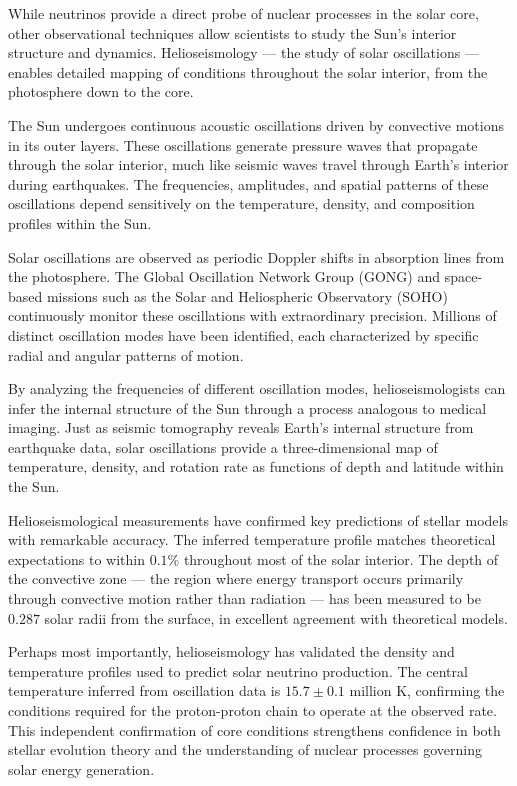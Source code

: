 While neutrinos provide a direct probe of nuclear processes in the solar core, other observational techniques allow scientists to study the Sun's interior structure and dynamics. Helioseismology — the study of solar oscillations — enables detailed mapping of conditions throughout the solar interior, from the photosphere down to the core.

The Sun undergoes continuous acoustic oscillations driven by convective motions in its outer layers. These oscillations generate pressure waves that propagate through the solar interior, much like seismic waves travel through Earth's interior during earthquakes. The frequencies, amplitudes, and spatial patterns of these oscillations depend sensitively on the temperature, density, and composition profiles within the Sun.

Solar oscillations are observed as periodic Doppler shifts in absorption lines from the photosphere. The Global Oscillation Network Group (GONG) and space-based missions such as the Solar and Heliospheric Observatory (SOHO) continuously monitor these oscillations with extraordinary precision. Millions of distinct oscillation modes have been identified, each characterized by specific radial and angular patterns of motion.

By analyzing the frequencies of different oscillation modes, helioseismologists can infer the internal structure of the Sun through a process analogous to medical imaging. Just as seismic tomography reveals Earth's internal structure from earthquake data, solar oscillations provide a three-dimensional map of temperature, density, and rotation rate as functions of depth and latitude within the Sun.

Helioseismological measurements have confirmed key predictions of stellar models with remarkable accuracy. The inferred temperature profile matches theoretical expectations to within $0.1\%$ throughout most of the solar interior. The depth of the convective zone — the region where energy transport occurs primarily through convective motion rather than radiation — has been measured to be $0.287$ solar radii from the surface, in excellent agreement with theoretical models.

Perhaps most importantly, helioseismology has validated the density and temperature profiles used to predict solar neutrino production. The central temperature inferred from oscillation data is $15.7 \pm 0.1$ million K, confirming the conditions required for the proton-proton chain to operate at the observed rate. This independent confirmation of core conditions strengthens confidence in both stellar evolution theory and the understanding of nuclear processes governing solar energy generation.


